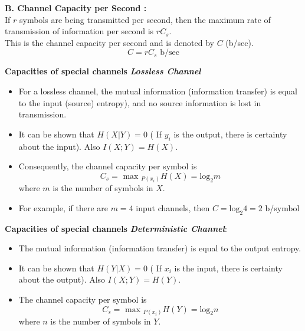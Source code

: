 \documentclass[a4]{beamer}
\begin{document}


\textbf{B. Channel Capacity per Second :}\\
If $r$ symbols are being transmitted per second, then the maximum rate of transmission of
information per second is $rC_s$.\\ This is the channel capacity per second and is denoted by $C$ (b/sec).
\[C = rC_s     \mbox{          b/sec} \]






\noindent \textbf{Capacities of special channels}
\textbf{\emph{Lossless Channel}}\\\begin{itemize} \item For a lossless channel, the mutual information (information transfer) is equal to the input (source) entropy), and no source information is lost in transmission.\item It can be shown that $H(X|Y) = 0$ ( If $y_i$ is the output, there is certainty about the input). Also $I(X;Y) = H(X)$.
\item Consequently, the channel capacity per symbol is
\[ C_s = \mbox{ max }_{P(x_i)} H(X) = \mbox{log}_2m \]
where $m$ is the number of symbols in $X$.
\item For example, if there are $m=4$ input channels, then $C =  \mbox{log}_2 4 = 2$ b/symbol  \end{itemize}



\noindent \textbf{Capacities of special channels}
\textbf{\emph{Deterministic Channel}}:
\begin{itemize}
\item The mutual information (information transfer) is equal to the output entropy.
\item It can be shown that $H(Y|X) = 0$ ( If $x_i$ is the input, there is certainty about the output). Also $I(X;Y) = H(Y)$.
\item  The channel capacity per symbol is
\[ C_s = \mbox{ max }_{P(x_i)} H(Y) = \mbox{log}_2n \]
where $n$ is the number of symbols in $Y$.
\end{itemize}
\end{document}
